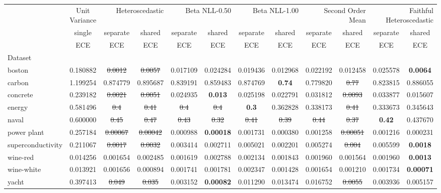 \begin{tabular}{l|c|cc|cc|cc|cc|cc}
\toprule
{} & {Unit Variance} & \multicolumn{2}{r}{Heteroscedastic} & \multicolumn{2}{r}{Beta NLL-0.50} & \multicolumn{2}{r}{Beta NLL-1.00} & \multicolumn{2}{r}{Second Order Mean} & \multicolumn{2}{r}{Faithful Heteroscedastic} \\
{} & {single} & {separate} & {shared} & {separate} & {shared} & {separate} & {shared} & {separate} & {shared} & {separate} & {shared} \\
{} & {ECE} & {ECE} & {ECE} & {ECE} & {ECE} & {ECE} & {ECE} & {ECE} & {ECE} & {ECE} & {ECE} \\
{Dataset} & {} & {} & {} & {} & {} & {} & {} & {} & {} & {} & {} \\
\midrule
boston & 0.180882 & \sout{0.0012} & \sout{0.0057} & 0.017109 & 0.024284 & 0.019436 & 0.012968 & 0.022192 & 0.012458 & 0.025578 & \textbf{0.0064} \\
carbon & 1.199254 & 0.874779 & 0.895687 & 0.839191 & 0.859483 & 0.874769 & \textbf{0.74} & 0.779820 & \sout{0.77} & 0.823815 & 0.886055 \\
concrete & 0.239182 & \sout{0.0021} & \sout{0.0051} & 0.024935 & \textbf{0.013} & 0.025198 & 0.022791 & 0.031812 & \sout{0.0093} & 0.033877 & 0.015607 \\
energy & 0.581496 & \sout{0.4} & \sout{0.41} & \sout{0.4} & \sout{0.4} & \textbf{0.3} & 0.362828 & 0.338173 & \sout{0.41} & 0.333673 & 0.345643 \\
naval & 0.600000 & \sout{0.45} & \sout{0.47} & \sout{0.43} & \sout{0.32} & \sout{0.41} & \sout{0.39} & \sout{0.44} & \sout{0.37} & \textbf{0.42} & 0.437670 \\
power plant & 0.257184 & \sout{0.00067} & \sout{0.00042} & 0.000988 & \textbf{0.00018} & 0.001731 & 0.000380 & 0.001258 & \sout{0.00051} & 0.001216 & 0.000231 \\
superconductivity & 0.211067 & \sout{0.0017} & \sout{0.0032} & 0.003414 & 0.002711 & 0.005021 & 0.002201 & 0.005274 & \sout{0.004} & 0.005599 & \textbf{0.0018} \\
wine-red & 0.014256 & 0.001654 & 0.002485 & 0.001619 & 0.002788 & 0.002134 & 0.001843 & 0.001960 & 0.001564 & 0.001960 & \textbf{0.0013} \\
wine-white & 0.013921 & 0.001656 & 0.000894 & 0.001741 & 0.001781 & 0.002347 & 0.001428 & 0.001654 & 0.001210 & 0.001734 & \textbf{0.00071} \\
yacht & 0.397413 & \sout{0.049} & \sout{0.035} & 0.003152 & \textbf{0.00082} & 0.011290 & 0.013474 & 0.016752 & \sout{0.0055} & 0.003936 & 0.005157 \\
\bottomrule
\end{tabular}

